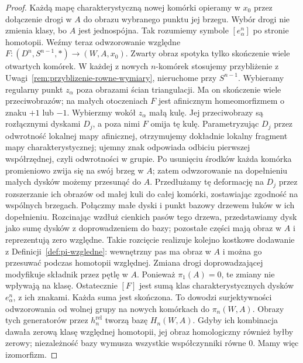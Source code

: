 \begin{proof}
Każdą mapę charakterystyczną nowej komórki opieramy w $x_0$
przez dołączenie drogi w $A$ do obrazu wybranego punktu jej brzegu.
Wybór drogi nie zmienia klasy, bo $A$ jest jednospójna.
Tak rozumiemy symbole $[e_\alpha^n]$ po stronie homotopii.
Weźmy teraz odwzorowanie względne
$F:(D^n,S^{n-1},*)\to(W,A,x_0)$.
Zwarty obraz spotyka
tylko skończenie wiele
otwartych komórek.
W każdej z nowych $n$-komórek stosujemy przybliżenie
z Uwagi~\ref{rem:przyblizenie-rowne-wymiary}, nieruchome przy $S^{n-1}$.
Wybieramy regularny punkt $z_\alpha$ poza obrazami ścian triangulacji.
Ma on skończenie wiele przeciwobrazów; na małych otoczeniach
$F$ jest afinicznym homeomorfizmem o znaku $+1$ lub $-1$.
Wybierzmy wokół $z_\alpha$ małą kulę. Jej przeciwobrazy są rozłącznymi
dyskami $D_j$, a poza nimi $F$ omija tę kulę.
Parametryzując $D_j$ przez odwrotność lokalnej mapy afinicznej,
otrzymujemy dokładnie lokalny fragment mapy charakterystycznej;
ujemny znak odpowiada odbiciu pierwszej współrzędnej, czyli odwrotności w grupie. Po usunięciu
środków każda komórka
promieniowo zwija się
na swój brzeg w $A$;
zatem odwzorowanie na dopełnieniu
małych dysków możemy
przesunąć do $A$.
Przedłużamy tę deformację na $D_j$ przez rozszerzanie ich obrazów
od małej kuli do całej komórki, zostawiając zgodność na wspólnych brzegach.
Połączmy małe dyski i punkt bazowy drzewem łuków w ich dopełnieniu.
Rozcinając wzdłuż cienkich pasów tego drzewa, przedstawiamy dysk
jako sumę dysków z doprowadzeniem do bazy; pozostałe części mają obraz w $A$
i reprezentują zero względne. Takie rozcięcie realizuje kolejno
kostkowe dodawanie z Definicji~\ref{def:pi-wzgledne}:
wewnętrzny pas ma obraz w $A$ i można go przesuwać podczas homotopii względnej.
Zmiana drogi doprowadzającej modyfikuje składnik przez pętlę w $A$.
Ponieważ $\pi_1(A)=0$, te zmiany nie wpływają na klasę.
Ostatecznie $[F]$ jest sumą klas charakterystycznych dysków
$e_\alpha^n$, z ich znakami. Każda suma jest skończona.
To dowodzi surjektywności
odwzorowania od wolnej grupy
na nowych komórkach
do $\pi_n(W,A)$.
Obrazy tych generatorów
przez $h_n^{\mathrm{rel}}$
tworzą bazę
$H_n(W,A)$. Gdyby ich
kombinacja dawała
zerową klasę względnej
homotopii, jej obraz
homologiczny również
byłby zerowy; niezależność
bazy wymusza wszystkie
współczynniki równe $0$.
Mamy więc izomorfizm.


\end{proof}
